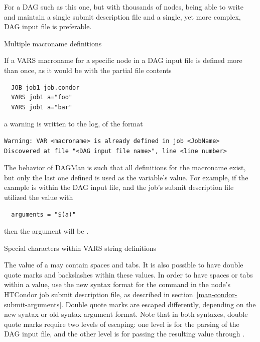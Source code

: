 For a DAG such as this one, but with thousands of nodes,
being able to write and maintain a single submit description file 
and a single, yet more complex, DAG input file is preferable.

\begin{description}
\item[Multiple macroname definitions]
\end{description}

If a VARS macroname for a specific node in a DAG input file is defined
more than once,
as it would be with the partial file contents
\begin{verbatim}
  JOB job1 job.condor
  VARS job1 a="foo"
  VARS job1 a="bar"
\end{verbatim}
a warning is written to the log, of the format 
\begin{verbatim}
Warning: VAR <macroname> is already defined in job <JobName>
Discovered at file "<DAG input file name>", line <line number>
\end{verbatim}

The behavior of DAGMan is such that all definitions for the macroname
exist,
but only the last one defined is used as the variable's value.
For example, if the example is within the DAG input file,
and the job's submit description file utilized the value with
\begin{verbatim}
  arguments = "$(a)"
\end{verbatim}
then the argument will be .

\begin{description}
\item[Special characters within VARS string definitions]
\end{description}

The value of a   may contain spaces and tabs.
It is also possible to have double quote marks and
backslashes within these values.
In order to have spaces or tabs within a value,
use the new syntax format for the  command
in the node's HTCondor job submit description file,
as described in section~\ref{man-condor-submit-arguments}.
Double quote marks are escaped differently,
depending on the new syntax or old syntax argument format.
Note that in both syntaxes,
double quote marks require two levels of escaping:
one level is for the parsing of the DAG input file, and the other level is for
passing the resulting value through .

